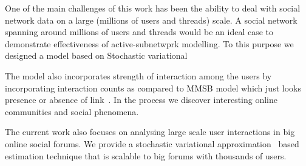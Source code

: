 One of the main challenges of this work has been the ability to deal with
social network data on a large (millions of users and threads) scale. A
social network spanning around millions of users and threads would be an ideal
case to demonstrate effectiveness of active-subnetwprk modelling. To this
purpose we designed a model based on Stochastic variational 

The model also incorporates strength of interaction
among the users by incorporating interaction counts as compared to MMSB model
which just looks presence or absence of link~\cite{Airoldi:2008:MMS:1390681.1442798}. 
In the process we discover interesting online communities and social phenomena.

The current work also focuses on analysing large scale user interactions in big
online social forums. We provide a stochastic variational
approximation~\cite{Hoffman:2013:SVI} based estimation technique that is
scalable to big forums with thousands of users.



